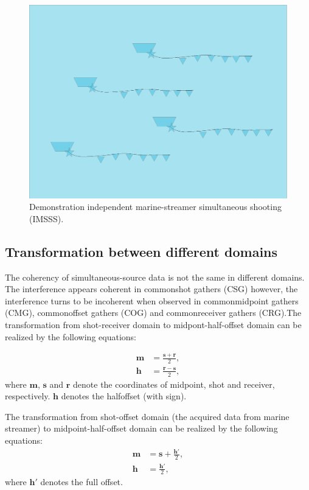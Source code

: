 \begin{figure}[htb!]
  \centering
 \includegraphics[width=\columnwidth,height=0.5\columnwidth]{Fig/streamer_demo}
   \caption{Demonstration  independent marine-streamer simultaneous shooting (IMSSS).} 
    \label{fig:streamer}
\end{figure}

\subsection{Transformation between different domains}
The coherency of  simultaneous-source data is not the same in different domains. The interference appears coherent in common\new{-}shot gathers (CSG)\old{,}\new{;} however, the interference turns  to be incoherent when observed in common\new{-}midpoint gathers (CMG), common\new{-}offset gathers (COG) and common\new{-}receiver gathers (CRG).The transformation from shot-receiver domain to midpont-half-offset domain can be realized by the following equations:



\begin{align}
\label{eq:trans1}
\mathbf{m} &= \frac{\mathbf{s}+\mathbf{r}}{2}, \\
\mathbf{h} &= \frac{\mathbf{r}-\mathbf{s}}{2},
\end{align}
where $\mathbf{m}$, $\mathbf{s}$ and $\mathbf{r}$ denote the coordinates of midpoint, shot\new{,} and receiver, respectively. $\mathbf{h}$ denotes the half\new{-}offset (with sign).

The transformation from shot-offset domain (the acquired data from marine streamer) to midpoint-half-offset domain can be realized by the following equations:
\begin{align}
\label{eq:trans2}
\mathbf{m} &= \mathbf{s}+\frac{\mathbf{h}'}{2}, \\
\mathbf{h} &= \frac{\mathbf{h}'}{2},
\end{align}
where $\mathbf{h}'$ denotes the full offset.


